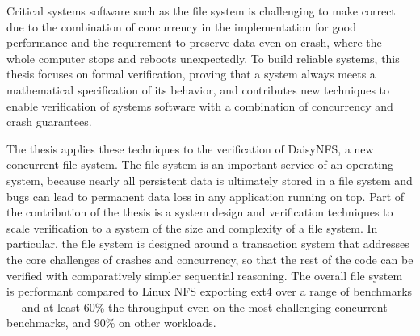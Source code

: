 Critical systems software such as the file system is challenging to make correct
due to the combination of concurrency in the implementation for good performance
and the requirement to preserve data even on crash, where the whole computer
stops and reboots unexpectedly. To build reliable systems, this thesis focuses
on formal verification, proving that a system always meets a mathematical
specification of its behavior, and contributes new techniques to enable
verification of systems software with a combination of concurrency and crash
guarantees.

The thesis applies these techniques to the verification of DaisyNFS, a new
concurrent file system. The file system is an important service of an operating
system, because nearly all persistent data is ultimately stored in a file system
and bugs can lead to permanent data loss in any application running on top. Part
of the contribution of the thesis is a system design and verification techniques
to scale verification to a system of the size and complexity of a file system.
In particular, the file system is designed around a transaction system that
addresses the core challenges of crashes and concurrency, so that the rest of
the code can be verified with comparatively simpler sequential reasoning. The
overall file system is performant compared to Linux NFS exporting ext4 over a
range of benchmarks --- and at least 60\% the throughput even on the most
challenging concurrent benchmarks, and 90\% on other workloads.
